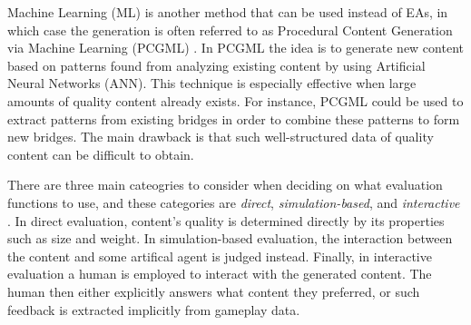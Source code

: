 Machine Learning (ML) is another method that can be used instead of EAs, in which case the generation is often referred to as Procedural Content Generation via Machine Learning (PCGML) \cite{pcgml} \cite{pcgml2} \cite{pcgml3}.
In PCGML the idea is to generate new content based on patterns found from analyzing existing content by using Artificial Neural Networks (ANN).
This technique is especially effective when large amounts of quality content already exists.
For instance, PCGML could be used to extract patterns from existing bridges in order to combine these patterns to form new bridges.
The main drawback is that such well-structured data of quality content can be difficult to obtain.

There are three main cateogries to consider when deciding on what evaluation functions to use, and these categories are \textit{direct}, \textit{simulation-based}, and \textit{interactive} \cite[p.5-7]{search_based_pcg}.
In direct evaluation, content's quality is determined directly by its properties such as size and weight.
In simulation-based evaluation, the interaction between the content and some artifical agent is judged instead.
Finally, in interactive evaluation a human is employed to interact with the generated content.
The human then either explicitly answers what content they preferred, or such feedback is extracted implicitly from gameplay data.

